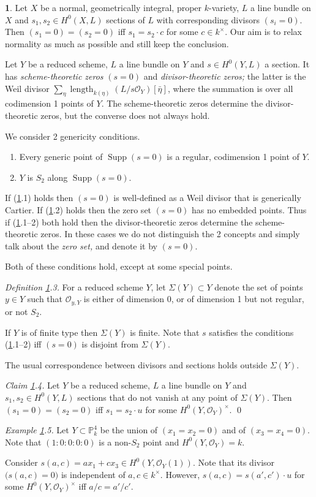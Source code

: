 \documentclass{amsart}
\theoremstyle{definition}
\newtheorem{say}[thm]{}
\theoremstyle{remark}
\renewcommand{\o}[0]{{\mathcal O}}
\newcommand{\p}[0]{{\mathbb P}}
\newcommand{\supp}[0]{\operatorname{Supp}}
\newcommand{\len}[0]{\operatorname{length}}
\begin{document}
\begin{say}\label{section.zeros.say}
Let $X$ be a normal, geometrically integral, proper $k$-variety,
$L$  a line bundle on $X$ and $s_1, s_2\in H^0(X, L)$ sections of $L$ with corresponding divisors  $(s_i=0)$. Then  $(s_1=0)=(s_2=0)$ iff
$s_1=s_2\cdot c$ for some  $c\in k^\times$. 
Our aim is to relax normality as much as possible and still keep the conclusion.

 Let $Y$ be a reduced scheme,  $L$  a line bundle on $Y$ and $s\in H^0(Y, L)$ a section. It has  {\it  scheme-theoretic zeros}  $(s=0)$ and 
 {\it  divisor-theoretic zeros;} the latter is the Weil divisor
$\sum_\eta \len_{k(\eta)}(L/s\o_Y) [\bar\eta]$, where the summation is over all codimension 1 points of $Y$. The scheme-theoretic zeros determine the 
divisor-theoretic zeros, but the converse does not always hold.


 We consider 2 genericity conditions.
\begin{enumerate}
\item Every generic point of $\supp(s=0)$ is a regular, codimension 1 point of $Y$.
\item $Y$ is  $S_2$ along $\supp(s=0)$.
\end{enumerate}
If (\ref{section.zeros.say}.1) holds then $(s=0)$ is well-defined as a  Weil divisor that is generically Cartier. 
If (\ref{section.zeros.say}.2) holds then the zero set  $(s=0)$ has no embedded points. Thus if (\ref{section.zeros.say}.1--2) both hold then the divisor-theoretic zeros determine the scheme-theoretic zeros. In these cases we do not distinguish the 2 concepts and simply talk about the {\it zero set,}  and denote it by $(s=0)$.  

Both of these conditions hold, except at some special points.

\medskip
{\it Definition \ref{section.zeros.say}.3.} For a  reduced scheme $Y$, 
let $ \Sigma(Y)\subset Y$ denote the set of points $y\in Y$ such that
$\o_{y,Y}$ is either of dimension 0,  or of dimension 1 but not regular, or  not $S_2$. 

If $Y$ is of finite type then $ \Sigma(Y)$ is finite.
Note that $s$ satisfies the conditions (\ref{section.zeros.say}.1--2) iff  $(s=0)$ is disjoint from  $ \Sigma(Y)$. 

The usual correspondence between divisors and sections holds outside $\Sigma(Y)$. 

\medskip
{\it Claim \ref{section.zeros.say}.4.}  Let $Y$ be a reduced scheme,
 $L$  a line bundle on $Y$ and $s_1, s_2\in H^0(Y, L)$ sections that do  not vanish at any point of  $\Sigma(Y)$. 
Then  $(s_1=0)=(s_2=0)$ iff  $s_1=s_2\cdot u$ for some $H^0(Y, \o_Y)^\times$. \qed

\medskip

{\it Example \ref{section.zeros.say}.5.} Let $Y\subset \p^4_k$ be the union of
$(x_1=x_2=0)$ and of $(x_3=x_4=0)$. Note that  $(1{:}0{:}0{:}0{:}0)$ is a non-$S_2$ point and $H^0(Y, \o_Y)=k$. 

 Consider  $s(a,c)=ax_1+cx_3\in H^0(Y, \o_Y(1))$. Note that
its divisor  $\bigl(s(a,c)=0\bigr)$ is independent of $a,c\in k^\times$.
However,  $s(a,c)=s(a',c')\cdot u$ for some $H^0(Y, \o_Y)^\times$
iff $a/c=a'/c'$. 
\end{say}
\end{document}
